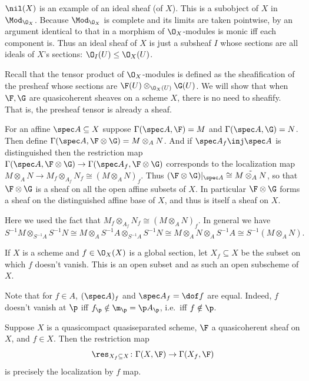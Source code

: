 \bnote

    $\nil(X)$ is an example of an {\emphcolor ideal sheaf} (of $X$).
    This is a subobject of $X$ in $\Mod_{\O_X}$.
    Because $\Mod_{\O_X}$ is complete and its limits are taken pointwise, by an argument identical to that in  a morphism of $\O_X$-modules
    is monic iff each component is.
    Thus an ideal sheaf of $X$ is just a subsheaf $I$ whose sections are all ideals of $X$'s sections: $\O_I(U)\leq\O_X(U)$.

\enote

Recall that the tensor product of $\O_X$-modules is defined as the sheafification of the presheaf whose sections are $\F(U)\otimes_{\O_X(U)}\G(U)$.
We will show that when $\F,\G$ are quasicoherent sheaves on a scheme $X$, there is no need to sheafify.
That is, the presheaf tensor is already a sheaf.

For an affine $\spec A\subseteq X$ suppose $\Gamma(\spec A,\F)=M$ and $\Gamma(\spec A,\G)=N$.
Then define $\Gamma(\spec A,\F\otimes\G)=M\otimes_AN$.
And if $\spec A_f\inj\spec A$ is distinguished then the restriction map $\Gamma(\spec A,\F\otimes\G)\to\Gamma(\spec A_f,\F\otimes\G)$ corresponds to the localization map
$M\otimes_A N\to M_f\otimes_{A_f} N_f\cong(M\otimes_AN)_f$.
Thus $(\F\otimes\G)|_{\spec A}\cong\tilde{M\otimes_AN}$, so that $\F\otimes\G$ is a sheaf on all the open affine subsets of $X$.
In particular $\F\otimes\G$ forms a sheaf on the distinguished affine base of $X$, and thus is itself a sheaf on $X$.

\bnote

    Here we used the fact that $M_f\otimes_{A_f}N_f\cong(M\otimes_AN)_f$.
    In general we have
    $$ S^{-1}M\otimes_{S^{-1}A}S^{-1}N \cong M\otimes_AS^{-1}A\otimes_{S^{-1}A}S^{-1}N \cong M\otimes_AN\otimes_AS^{-1}A \cong S^{-1}(M\otimes_AN) . $$

\enote

\bdefn

    If $X$ is a scheme and $f\in\O_X(X)$ is a global section, let $X_f\subseteq X$ be the subset on which $f$ doesn't vanish.
    This is an open subset and as such an open subscheme of $X$.

\edefn

Note that for $f\in A$, $(\spec A)_f$ and $\spec A_f=\dof f$ are equal.
Indeed, $f$ doesn't vanish at $\p$ iff $f_\p\notin\m_\p=\p A_\p$, i.e.\ iff $f\notin\p$.

\blemm[title={The Qcqs lemma}, name={qcqslemm}]

    Suppose $X$ is a quasicompact quasiseparated scheme, $\F$ a quasicoherent sheaf on $X$, and $f\in X$.
    Then the restriction map
    $$ \res_{X_f\subseteq X} \colon \Gamma(X,\F) \to \Gamma(X_f,\F) $$
    is precisely the localization by $f$ map.

